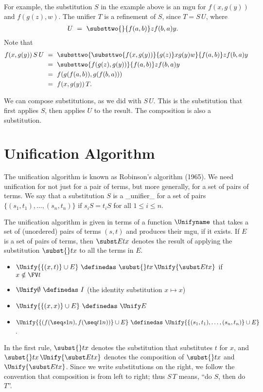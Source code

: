 For example, the substitution $S$ in the example above is an mgu for $f(x,g(y))$ and $f(g(z),w)$. The unifier $T$ is a refinement of $S$, since $T = S\,U$, where
\begin{align*}
U\ &=\ \substtwo{}{f(a,b)}z{f(b,a)}y.
\end{align*}
Note that
\begin{align*}
f(x,g(y))\,S\,U\ &=\ \substtwo{\substtwo{f(x,g(y))}{g(z)}x{g(y)}w}{f(a,b)}z{f(b,a)}y\\
&=\ \substtwo{f(g(z),g(y))}{f(a,b)}z{f(b,a)}y\\
&=\ f(g(f(a,b)),g(f(b,a)))\\
&=\ f(x,g(y))\,T.
\end{align*}

We can compose substitutions, as we did with $S\,U$. This is the substitution that first applies $S$, then applies $U$ to the result. The composition is also a substitution.

\section{Unification Algorithm}

The unification algorithm is known as Robinson's algorithm (1965). We need unification for not just for a pair of terms, but more generally, for a set of pairs of terms. We say that a substitution $S$ is a _unifier_ for a set of pairs $\{(s_1,t_1),\ldots,(s_n,t_n)\}$ if $s_iS = t_iS$ for all $1\leq i\leq n$.

The unification algorithm is given in terms of a function $\Unifyname$ that takes a set of (unordered) pairs of terms $(s,t)$ and produces their mgu, if it exists. If $E$ is a set of pairs of terms, then $\subst Etx$ denotes the result of applying the substitution $\subst{}tx$ to all the terms in $E$.
\begin{itemize}
\item
$\Unify{\{(x,t)\}\cup E}\ \definedas\ \subst{}tx\,\Unify{\subst Etx}$ if $x\notin\FV t$
\item
$\Unify\emptyset\ \definedas\ I$ (the identity substitution $x\mapsto x$)
\item
$\Unify{\{(x,x)\}\cup E}\ \definedas\ \Unify E$
\item
$\Unify{\{(f(\seq s1n),f(\seq t1n))\}\cup E}\ \definedas\ \Unify{\{(s_1,t_1),\ldots,(s_n,t_n)\}\cup E}$.
\end{itemize}
In the first rule, $\subst{}tx$ denotes the substitution that substitutes $t$ for $x$,
and $\subst{}tx\,\Unify{\subst Etx}$ denotes the composition of $\subst{}tx$ and $\Unify{\subst Etx}$. Since we write substitutions on the right, we follow the convention that composition is from left to right; thus $S\,T$ means, ``do $S$, then do $T$''.

